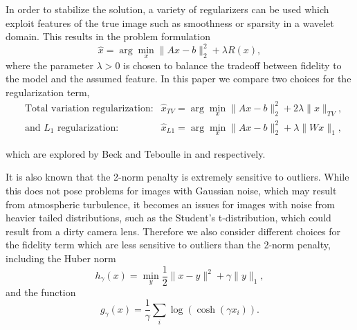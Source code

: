 \documentclass[10pt,a4paper]{article}
\begin{document}
In order to stabilize the solution, a variety of regularizers can be used which exploit features of the true image such as smoothness or sparsity in a wavelet domain. This results in the problem formulation
\begin{equation}
\hat{x} = \arg\min_{x} \| Ax - b \|_2^2 + \lambda R(x),
\end{equation}
where the parameter $\lambda > 0$ is chosen to balance the tradeoff between fidelity to the model and the assumed feature. In this paper we compare two choices for the regularization term, 
\begin{align}
&\text{Total variation regularization:} &\hat{x}_{TV} = \arg\min_x \| Ax - b \|_2^2 + 2\lambda \| x \|_{TV} , \\
&\text{and } L_1 \text{ regularization:} &\hat{x}_{L1} = \arg\min_x \| Ax - b \|_2^2 + \lambda \| Wx \|_1  ,
\end{align}

which are explored by Beck and Teboulle in \cite{TV} and \cite{FISTA} respectively.

It is also known that the 2-norm penalty is extremely sensitive to outliers. While this does not pose problems for images with Gaussian noise, which may result from atmospheric turbulence, it becomes an issues for images with noise from heavier tailed distributions, such as the Student's t-distribution, which could result from a dirty camera lens. Therefore we also consider different choices for the fidelity term which are less sensitive to outliers than the 2-norm penalty, including the Huber norm
\begin{equation}
h_{\gamma}(x) = \min_y \frac{1}{2} \| x - y \|^2 + \gamma \| y \|_1,
\end{equation}
and the function
\begin{equation}
g_{\gamma}(x) = \frac{1}{\gamma} \sum_i \log\left(\cosh\left(\gamma x_i\right)\right).
\end{equation}


\end{document}
